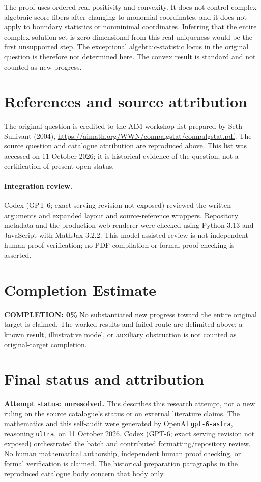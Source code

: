 \documentclass[11pt]{article}
\begin{document}
The proof uses ordered real positivity and convexity. It does not control complex algebraic score fibers after changing to monomial coordinates, and it does not apply to boundary statistics or nonminimal coordinates. Inferring that the entire complex solution set is zero-dimensional from this real uniqueness would be the first unsupported step. The exceptional algebraic-statistic locus in the original question is therefore not determined here. The convex result is standard and not counted as new progress.

\section{References and source attribution}
The original question is credited to the AIM workshop list prepared by Seth Sullivant (2004), \url{https://aimath.org/WWN/compalgstat/compalgstat.pdf}. The source question and catalogue attribution are reproduced above. This list was accessed on 11 October 2026; it is historical evidence of the question, not a certification of present open status.


\paragraph{Integration review.} Codex (GPT-6; exact serving revision not exposed) reviewed the written arguments and expanded layout and source-reference wrappers. Repository metadata and the production web renderer were checked using Python 3.13 and JavaScript with MathJax 3.2.2. This model-assisted review is not independent human proof verification; no PDF compilation or formal proof checking is asserted.

\section{Completion Estimate}
\noindent\textbf{COMPLETION: 0\%}
No substantiated new progress toward the entire original target is claimed. The worked results and failed route are delimited above; a known result, illustrative model, or auxiliary obstruction is not counted as original-target completion.

\section{Final status and attribution}
\textbf{Attempt status: unresolved.} This describes this research attempt, not a new ruling on the source catalogue's status or on external literature claims.
The mathematics and this self-audit were generated by OpenAI \texttt{gpt-6-astra}, reasoning \texttt{ultra}, on 11 October 2026. Codex (GPT-6; exact serving revision not exposed) orchestrated the batch and contributed formatting/repository review. No human mathematical authorship, independent human proof checking, or formal verification is claimed. The historical preparation paragraphs in the reproduced catalogue body concern that body only.
\end{document}
